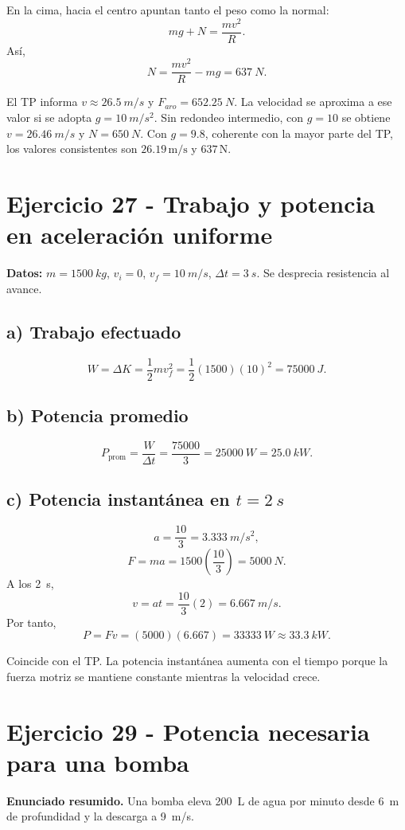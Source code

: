 \documentclass[11pt,a4paper]{article}
\begin{document}
En la cima, hacia el centro apuntan tanto el peso como la normal:
\[
mg+N=\frac{mv^2}{R}.
\]
Así,
\[
N=\frac{mv^2}{R}-mg
=\boxed{\SI{637}{N}}.
\]

\begin{alerta}
El TP informa \(v\approx\SI{26.5}{m/s}\) y \(F_{aro}=\SI{652.25}{N}\). La velocidad se aproxima a ese valor si se adopta \(g=\SI{10}{m/s^2}\). Sin redondeo intermedio, con \(g=10\) se obtiene \(v=\SI{26.46}{m/s}\) y \(N=\SI{650}{N}\). Con \(g=9.8\), coherente con la mayor parte del TP, los valores consistentes son \(26.19\,\mathrm{m/s}\) y \(637\,\mathrm{N}\).
\end{alerta}

\section{Ejercicio 27 - Trabajo y potencia en aceleración uniforme}
\textbf{Datos:} \(m=\SI{1500}{kg}\), \(v_i=0\), \(v_f=\SI{10}{m/s}\), \(\Delta t=\SI{3}{s}\). Se desprecia resistencia al avance.

\subsection*{a) Trabajo efectuado}
\[
W=\Delta K=\frac12mv_f^2
=\frac12(1500)(10)^2
=\boxed{\SI{75000}{J}}.
\]

\subsection*{b) Potencia promedio}
\[
P_{\mathrm{prom}}=\frac{W}{\Delta t}
=\frac{75000}{3}
=\boxed{\SI{25000}{W}}=\boxed{\SI{25.0}{kW}}.
\]

\subsection*{c) Potencia instantánea en \(t=\SI{2}{s}\)}
\[
a=\frac{10}{3}=\SI{3.333}{m/s^2},
\]
\[
F=ma=1500\left(\frac{10}{3}\right)=\SI{5000}{N}.
\]
A los \SI{2}{s},
\[
v=at=\frac{10}{3}(2)=\SI{6.667}{m/s}.
\]
Por tanto,
\[
P=Fv=(5000)(6.667)
=\boxed{\SI{33333}{W}}\approx\boxed{\SI{33.3}{kW}}.
\]

\begin{validacion}
Coincide con el TP. La potencia instantánea aumenta con el tiempo porque la fuerza motriz se mantiene constante mientras la velocidad crece.
\end{validacion}

\section{Ejercicio 29 - Potencia necesaria para una bomba}
\textbf{Enunciado resumido.} Una bomba eleva \SI{200}{L} de agua por minuto desde \SI{6}{m} de profundidad y la descarga a \SI{9}{m/s}.
\end{document}
